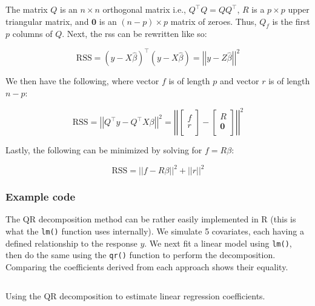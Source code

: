 \documentclass{report}
\begin{document}
The matrix $Q$ is an $n\times n$ orthogonal matrix i.e., $Q^\intercal Q = QQ^\intercal$, $R$ is a $p\times p$ upper triangular matrix, and $\symbf{0}$ is an $(n-p)\times p$ matrix of zeroes. Thus, $Q_f$ is the first $p$ columns of $Q$. Next, the \gls{rss} can be rewritten like so:

\begin{equation}\label{eq:ols-rss-qr-decomp-1}
    \text{RSS} = \left(y - X\hat{\beta}\right)^\intercal \left(y - X\hat{\beta}\right) = \left|\left|y - Z\hat{\beta}\right|\right|^2
\end{equation}

We then have the following, where vector $f$ is of length $p$ and vector $r$ is of length $n-p$:

\begin{equation}\label{eq:ols-rss-qr-decomp-2}
    \text{RSS} = \left|\left|Q^\intercal y - Q^\intercal X\beta\right|\right|^2 = \left|\left|\begin{bmatrix}
        f \\
        r \\
    \end{bmatrix} - \begin{bmatrix}
        R \\
        \symbf{0} \\
    \end{bmatrix}\right|\right|^2
\end{equation}

Lastly, the following can be minimized by solving for $f = R\beta$:

\begin{equation}\label{eq:ols-rss-qr-decomp-3}
    \text{RSS} = ||f - R\beta||^2 + ||r||^2
\end{equation}

\subsubsection{Example code}

The QR decomposition method can be rather easily implemented in R (this is what the \texttt{lm()} function uses internally). We simulate 5 covariates, each having a defined relationship to the response $y$. We next fit a linear model using \texttt{lm()}, then do the same using the \texttt{qr()} function to perform the decomposition. Comparing the coefficients derived from each approach shows their equality. 

\begin{listing}[h!]
\inputminted{r}{Example-Code/qr_decomp_linear_model.R}
\caption{Using the QR decomposition to estimate linear regression coefficients.}
\label{listing:qr-regression-example}
\end{listing}
\end{document}
